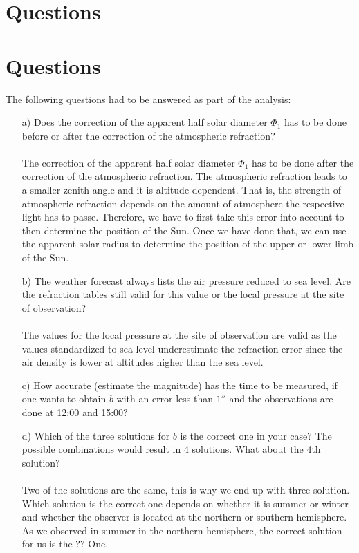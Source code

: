 
\section{Questions}
\section{Questions}
The following questions had to be answered as part of the analysis:

\begin{itemize}
\item[a)] Does the correction of the apparent half solar diameter $\Phi_1$ has to be done before or after the correction of the atmospheric refraction?
\\ \\
The correction of the apparent half solar diameter $\Phi_1$ has to be done after the correction of the atmospheric refraction. The atmospheric refraction leads to a smaller zenith angle and it is altitude dependent. That is, the strength of atmospheric refraction depends on the amount of atmosphere the respective light has to passe. Therefore, we have to first take this error into account to then determine the position of the Sun. Once we have done that, we can use the apparent solar radius to determine the position of the upper or lower limb of the Sun.
\item[b)] The weather forecast always lists the air pressure reduced to sea level.  Are the refraction tables still valid for this value or the local pressure at the site of observation?
\\ \\
The values for the local pressure at the site of observation are valid as the values standardized to sea level underestimate the refraction error since the air density is lower at altitudes higher than the sea level. 
\item[c)] How accurate (estimate the magnitude) has the time to be measured,  if one wants to obtain $b$ with an error less than $1''$ and the observations are done at 12:00 and 15:00?
\item[d)] Which of the three solutions for $b$ is the correct one in your case? The possible combinations would result in 4 solutions.  What about the 4th solution?
\\ \\
Two of the solutions are the same, this is why we end up with three solution. Which solution is the correct one depends on whether it is summer or winter and whether the observer is located at the northern or southern hemisphere. As we observed in summer in the northern hemisphere, the correct solution for us is the ?? One. 

\end{itemize}
